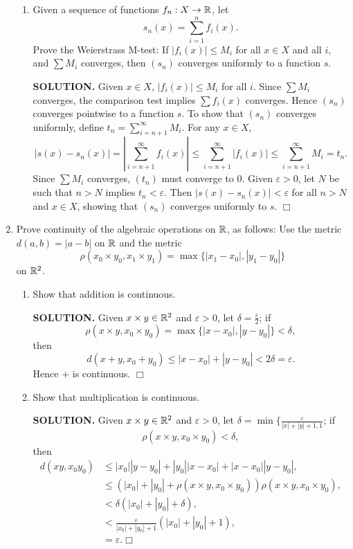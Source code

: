 \documentclass{article}
\begin{document}
\begin{enumerate}
\begin{enumerate}
        \item Given a sequence of functions $f_n: X \rightarrow \mathbb{R}$, let
        $$s_n(x) = \sum_{i=1}^n f_i(x).$$
        Prove the Weierstrass M-test: If $|f_i(x)| \leq M_i$ for all $x \in X$ and all $i$, and $\sum M_i$ converges, then $(s_n)$ converges uniformly to a function $s$.

        {\bf SOLUTION.} Given $x \in X$, $|f_i(x)| \leq M_i$ for all $i$. Since $\sum M_i$ converges, the comparison test implies $\sum f_i(x)$ converges. Hence $(s_n)$ converges pointwise to a function $s$. To show that $(s_n)$ converges uniformly, define $t_n = \sum_{i=n+1}^\infty M_i$. For any $x \in X$,
        $$|s(x) - s_n(x)| = \left| \sum_{i=n+1}^\infty f_i(x) \right| \leq \sum_{i=n+1}^\infty |f_i(x)| \leq \sum_{i=n+1}^\infty M_i = t_n.$$
        Since $\sum M_i$ converges, $(t_n)$ must converge to $0$. Given $\varepsilon > 0$, let $N$ be such that $n > N$ implies $t_n < \varepsilon$. Then $|s(x) - s_n(x)| < \varepsilon$ for all $n > N$ and $x \in X$, showing that $(s_n)$ converges uniformly to $s$. $\Box$
    \end{enumerate}

    \item Prove continuity of the algebraic operations on $\mathbb{R}$, as follows: Use the metric $d(a, b) = |a-b|$ on $\mathbb{R}$ and the metric
    $$\rho(x_0 \times y_0, x_1 \times y_1) = \max \{|x_1-x_0|, |y_1-y_0|\}$$
    on $\mathbb{R}^2$.
    \begin{enumerate}
        \item Show that addition is continuous.

        {\bf SOLUTION.} Given $x \times y \in \mathbb{R}^2$ and $\varepsilon > 0$, let $\delta = \frac{\varepsilon}{2}$; if
        $$\rho(x \times y, x_0 \times y_0) = \max \{|x-x_0|, |y-y_0|\} < \delta,$$
        then
        $$d(x + y, x_0 + y_0) \leq |x-x_0| + |y-y_0| < 2\delta = \varepsilon.$$
        Hence $+$ is continuous. $\Box$

        \item Show that multiplication is continuous.

        {\bf SOLUTION.} Given $x \times y\in \mathbb{R}^2$ and $\varepsilon > 0$, let $\delta = \min\{\frac{\varepsilon}{|x|+|y|+1, 1}$; if
        $$\rho(x \times y, x_0 \times y_0) < \delta,$$
        then
        \begin{align*}
            d(xy, x_0y_0) &\leq |x_0||y-y_0| + |y_0||x-x_0| + |x-x_0||y-y_0|, \\
            &\leq (|x_0| + |y_0| + \rho(x \times y, x_0 \times y_0)) \rho(x \times y, x_0 \times y_0), \\
            &< \delta(|x_0| + |y_0| + \delta), \\
            &< \frac{\varepsilon}{|x_0|+|y_0|+1}(|x_0|+|y_0|+1), \\
            &= \varepsilon. \Box
        \end{align*}
        

\end{enumerate}
\end{enumerate}
\end{document}
